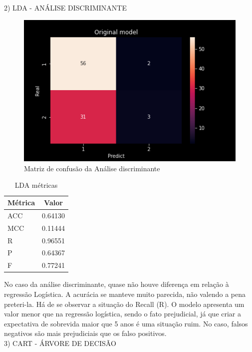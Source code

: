 \noindent \textcolor{deepblue}{2) LDA - ANÁLISE DISCRIMINANTE}

\begin{figure}[!h]
    \centering
    \includegraphics[width=\linewidth, scale=.6]{../../figuras/machine_learning/LDA_MC.png}
    \caption{Matriz de confusão da Análise discriminante}
\end{figure}

\begin{table}[]
    \centering
    \begin{tabular}{lc}
        \rowcolor{pagecolor!50!COLOR1}
        \hline
        Métrica & Valor   \\\hline\hline
        ACC     & 0.64130 \\\hline
        MCC     & 0.11444 \\\hline
        R       & 0.96551 \\\hline
        P       & 0.64367 \\\hline
        F       & 0.77241
    \end{tabular}
    \caption{LDA métricas}
\end{table}

No caso da análise discriminante, quase não houve diferença em relação à regressão Logística. A acurácia se manteve muito parecida, não valendo a pena preteri-la. Há de se observar a situação do Recall (R). O modelo apresenta um valor menor que na regressão logística, sendo o fato prejudicial, já que criar a expectativa de sobrevida maior que 5 anos é uma situação ruim. No caso, falsos negativos são mais prejudiciais que os falso positivos.\\

\noindent \textcolor{deepblue}{3) CART - ÁRVORE DE DECISÃO}


